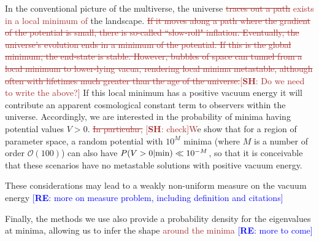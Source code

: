 \documentclass[12pt]{article}
\newcommand{\re}[1]{\textcolor{blue}{[{\bf RE}: #1]}}
\newcommand{\SH}[1]{\textcolor{brown}{[{\bf SH}: #1]}}
\newcommand{\sh}[1]{\textcolor{brown}{#1}}
\begin{document}

In the conventional picture of the multiverse, the universe \sh{\sout{traces out a path} exists in a local minimum of} the landscape. \sh{\sout{If it moves along a path where the gradient of the potential is small, there is so-called ``slow-roll" inflation. Eventually, the universe's evolution ends in a minimum of the potential. If this is the global minimum, the end-state is stable. However, bubbles of space can tunnel from a local minimum to lower-lying vacua, rendering local minima metastable, although often with lifetimes much greater than the age of the universe.}}\SH{Do we need to write the above?} If this local minimum has a positive vacuum energy it will contribute an apparent cosmological constant term to observers within the universe. Accordingly, we are interested in the probability of minima having potential values $V > 0$. \sh{\sout{In particular,} \SH{check}W}e show that for a region of parameter space, a random potential with $10^M$ minima (where $M$ is a number of order $\mathcal{O}(100)$) can also have $P(V > 0|{\rm min}) \ll 10^{-M}$, so that it is conceivable that these scenarios have no metastable solutions with  positive vacuum energy.

These considerations may lead to a weakly non-uniform measure on the vacuum energy  \re{more on measure problem, including definition and citations} 

Finally, the methods we use also provide a probability density for the eigenvalues at minima, allowing us to infer the shape \sh{around the minima} \re{more to come} 
\end{document}
